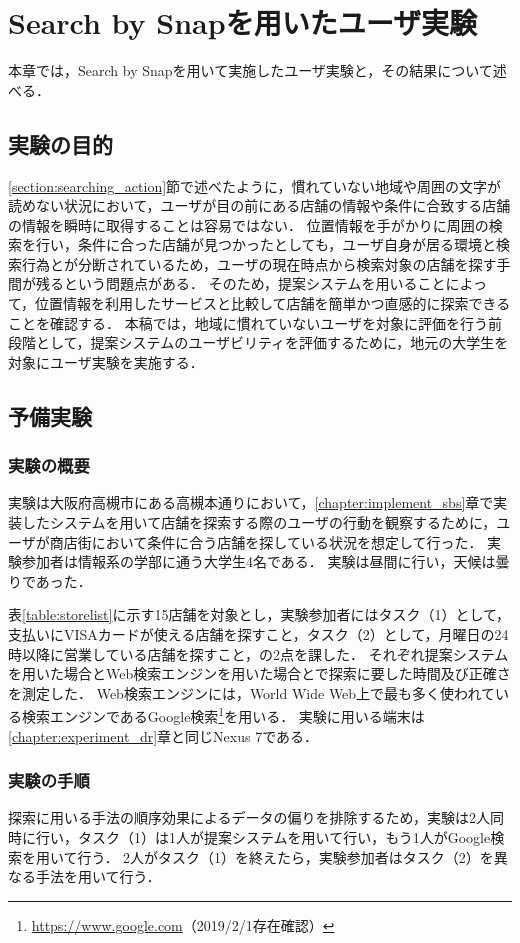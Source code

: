 \chapter{Search by Snapを用いたユーザ実験}
\label{chapter:experiment_sbs}
本章では，Search by Snapを用いて実施したユーザ実験と，その結果について述べる．
\section{実験の目的}
  \ref{section:searching_action}節で述べたように，慣れていない地域や周囲の文字が読めない状況において，ユーザが目の前にある店舗の情報や条件に合致する店舗の情報を瞬時に取得することは容易ではない．
  位置情報を手がかりに周囲の検索を行い，条件に合った店舗が見つかったとしても，ユーザ自身が居る環境と検索行為とが分断されているため，ユーザの現在時点から検索対象の店舗を探す手間が残るという問題点がある．
  そのため，提案システムを用いることによって，位置情報を利用したサービスと比較して店舗を簡単かつ直感的に探索できることを確認する．
  本稿では，地域に慣れていないユーザを対象に評価を行う前段階として，提案システムのユーザビリティを評価するために，地元の大学生を対象にユーザ実験を実施する．

\section{予備実験}
  \subsection{実験の概要}
    実験は大阪府高槻市にある高槻本通りにおいて，\ref{chapter:implement_sbs}章で実装したシステムを用いて店舗を探索する際のユーザの行動を観察するために，ユーザが商店街において条件に合う店舗を探している状況を想定して行った．
    実験参加者は情報系の学部に通う大学生4名である．
    実験は昼間に行い，天候は曇りであった．

    表\ref{table:storelist}に示す15店舗を対象とし，実験参加者にはタスク（1）として，支払いにVISAカードが使える店舗を探すこと，タスク（2）として，月曜日の24時以降に営業している店舗を探すこと，の2点を課した．
    それぞれ提案システムを用いた場合とWeb検索エンジンを用いた場合とで探索に要した時間及び正確さを測定した．
    Web検索エンジンには，World Wide Web上で最も多く使われている検索エンジン\cite{Alexa:2019}であるGoogle検索\footnote{\url{https://www.google.com}（2019/2/1存在確認）}を用いる．
    実験に用いる端末は\ref{chapter:experiment_dr}章と同じNexus 7である．
    
  \subsection{実験の手順}
    探索に用いる手法の順序効果によるデータの偏りを排除するため，実験は2人同時に行い，タスク（1）は1人が提案システムを用いて行い，もう1人がGoogle検索を用いて行う．
    2人がタスク（1）を終えたら，実験参加者はタスク（2）を異なる手法を用いて行う．

